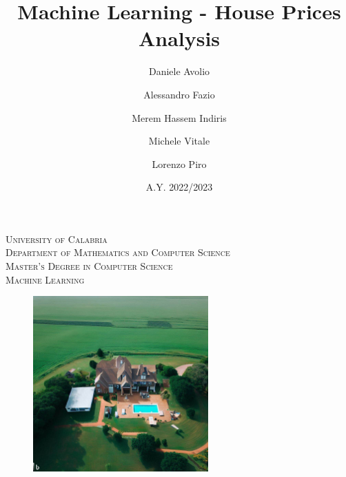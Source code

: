 \documentclass[12]{article}
\begin{document}
\begin{titlepage}
    \begin{center}
        \textsc{\LARGE University of Calabria}\\[1.5cm]
        \textsc{\Large Department of Mathematics and Computer Science}\\[0.5cm]
        \textsc{\large Master's Degree in Computer Science}\\[0.5cm]
        \textsc{\large Machine Learning}\\[0.5cm]
    \end{center}
\end{titlepage}

\title{Machine Learning - House Prices Analysis}
\author{Daniele Avolio\\
    \and
    Alessandro Fazio\\
    \and
    Merem Hassem Indiris\\
    \and
    Michele Vitale\\
    \and
    Lorenzo Piro\\}
\date{A.Y. 2022/2023}

\maketitle

\begin{figure}[h!]
    \centering
    \includegraphics[width=0.6\textwidth]{imgs/house.jpeg}
\end{figure}
\newpage





\end{document}

